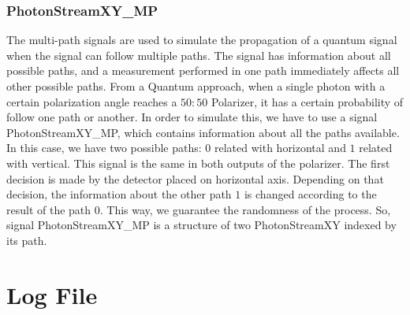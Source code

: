 \begin{refsection}
\subsubsection{PhotonStreamXY\_MP}
The multi-path signals are used to simulate the propagation of a quantum signal when the signal can follow multiple paths. The signal has information about all possible paths, and a measurement performed in one path immediately affects all other possible paths.
From a Quantum approach, when a single photon with a certain polarization angle reaches a $50:50$ Polarizer, it has a certain probability of follow one path or another. In order to simulate this, we have to use a signal PhotonStreamXY\_MP, which contains information about all the paths available. In this case, we have two possible paths: $0$ related with horizontal and $1$ related with vertical. This signal is the same in both outputs of the polarizer. The first decision is made by the detector placed on horizontal axis. Depending on that decision, the information about the other path $1$ is changed according to the result of the path $0$. This way, we guarantee the randomness of the process. So, signal PhotonStreamXY\_MP is a structure of two PhotonStreamXY indexed by its path.


\section{Log File}



\clearpage
\printbibliography[heading=subbibliography]
\end{refsection}
\cleardoublepage


